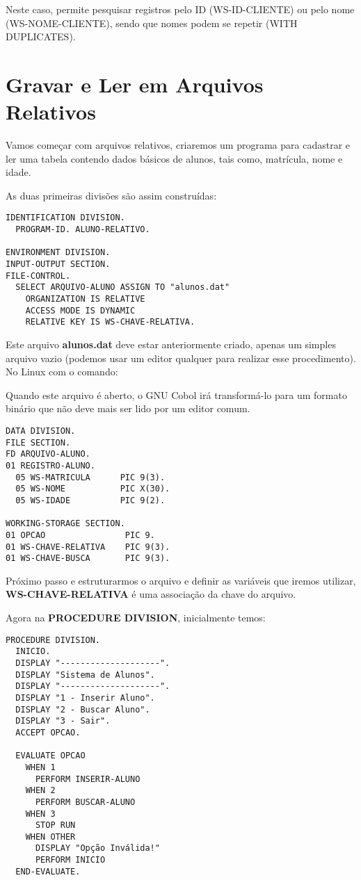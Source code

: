 Neste caso, permite pesquisar registros pelo ID (WS-ID-CLIENTE) ou pelo nome (WS-NOME-CLIENTE), sendo que nomes podem se repetir (WITH DUPLICATES).

\section{Gravar e Ler em Arquivos Relativos}
Vamos começar com arquivos relativos, criaremos um programa para cadastrar e ler uma tabela contendo dados básicos de alunos, tais como, matrícula, nome e idade.

As duas primeiras divisões são assim construídas:
\begin{lstlisting}[]
IDENTIFICATION DIVISION.
  PROGRAM-ID. ALUNO-RELATIVO.

ENVIRONMENT DIVISION.
INPUT-OUTPUT SECTION.
FILE-CONTROL.
  SELECT ARQUIVO-ALUNO ASSIGN TO "alunos.dat"
    ORGANIZATION IS RELATIVE
    ACCESS MODE IS DYNAMIC
    RELATIVE KEY IS WS-CHAVE-RELATIVA.	
\end{lstlisting}

Este arquivo \textbf{alunos.dat} deve estar anteriormente criado, apenas um simples arquivo vazio (podemos usar um editor qualquer para realizar esse procedimento). No Linux com o comando: \\

Quando este arquivo é aberto, o GNU Cobol irá transformá-lo para um formato binário que não deve mais ser lido por um editor comum.

\begin{lstlisting}[]
DATA DIVISION.
FILE SECTION.
FD ARQUIVO-ALUNO.
01 REGISTRO-ALUNO.
  05 WS-MATRICULA      PIC 9(3).  
  05 WS-NOME           PIC X(30). 
  05 WS-IDADE          PIC 9(2).  

WORKING-STORAGE SECTION.
01 OPCAO                PIC 9.
01 WS-CHAVE-RELATIVA    PIC 9(3).
01 WS-CHAVE-BUSCA       PIC 9(3).	
\end{lstlisting}

Próximo passo e estruturarmos o arquivo e definir as variáveis que iremos utilizar, \textbf{WS-CHAVE-RELATIVA} é uma associação da chave do arquivo.

Agora na \textbf{PROCEDURE DIVISION}, inicialmente temos:
\begin{lstlisting}[]
PROCEDURE DIVISION.
  INICIO.
  DISPLAY "--------------------".
  DISPLAY "Sistema de Alunos".
  DISPLAY "--------------------".
  DISPLAY "1 - Inserir Aluno".
  DISPLAY "2 - Buscar Aluno".
  DISPLAY "3 - Sair".
  ACCEPT OPCAO.

  EVALUATE OPCAO
    WHEN 1
      PERFORM INSERIR-ALUNO
    WHEN 2
      PERFORM BUSCAR-ALUNO
    WHEN 3
      STOP RUN
    WHEN OTHER
      DISPLAY "Opção Inválida!" 
      PERFORM INICIO
  END-EVALUATE.	
\end{lstlisting}

